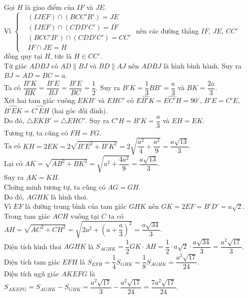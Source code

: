 \begin{ex}
{{
}
\noindent
Gọi $H$ là giao điểm của $IF$ và $JE$.\\
Vì $\left\{\begin{aligned}&(IJEF)\cap \left(BCC'B'\right)=JE \\&(IJEF)\cap \left(CDD'C'\right)=IF \\&\left(BCC'B'\right)\cap \left(CDD'C'\right)=CC' \\&IF\cap JE=H\end{aligned}\right.$ nên các đường thẳng $IF$, $JE$, $CC'$ đồng quy tại $H$, tức là $H\in CC'$.\\
Tứ giác $ADBJ$ có $AD\parallel BJ$ và $BD\parallel AJ$ nên $ADBJ$ là hình bình hành. Suy ra $BJ=AD=BC=a$.\\
Ta có $\dfrac{B'K}{BK}=\dfrac{B'E}{BJ} = \dfrac{B'E}{BC}=\dfrac{1}{2}$. Suy ra $B'K=\dfrac{1}{3}BB'=\dfrac{a}{3}$ và $BK=\dfrac{2a}{3}$.\\
Xét hai tam giác vuông $EKB'$ và $EHC'$ có $\widehat{EB'K}=\widehat{EC'H}=90^\circ$, $B'E=C'E$, $\widehat{B'EK}=\widehat{C'EH}$ (hai góc đối đỉnh).\\
Do đó, $\triangle EKB' = \triangle EHC'$. Suy ra $C'H=B'K=\dfrac{a}{3}$ và $EH=EK$.\\
Tương tự, ta cũng có $FH=FG$.\\
Ta có $KH=2EK=2\sqrt{B'E^2+B'K^2} = 2\sqrt{\dfrac{a^2}{4}+\dfrac{a^2}{9}} = \dfrac{a\sqrt{13}}{3}$.\\
Lại có $AK=\sqrt{AB^2+BK^2} = \sqrt{a^2+\dfrac{4a^2}{9}} = \dfrac{a\sqrt{13}}{3}$.\\
Suy ra $AK=KH$.\\
Chứng minh tương tự, ta cũng có $AG=GH$.\\
Do đó, $AGHK$ là hình thoi.\\
Vì $EF$ là đường trung bình của tam giác $GHK$ nên $GK=2EF=B'D'=a\sqrt{2}$.\\
Trong tam giác $ACH$ vuông tại $C$ ta có $AH=\sqrt{AC^2+CH^2} = \sqrt{2a^2+\left(a+\dfrac{a}{3}\right)^2} = \dfrac{a\sqrt{34}}{3}$.\\
Diện tích hình thoi $AGHK$ là $S_{AGHK}=\dfrac{1}{2}GK\cdot AH = \dfrac{1}{2}\cdot a\sqrt{2}\cdot \dfrac{a\sqrt{34}}{3} = \dfrac{a^2\sqrt{17}}{3}$.\\
Diện tích tam giác $EFH$ là $S_{EFH}=\dfrac{1}{4}S_{GHK}=\dfrac{1}{8}S_{AGHK} = \dfrac{a^2\sqrt{17}}{24}$.\\
Diện tích ngũ giác $AKEFG$ là $S_{AKEFG}=S_{AGHK}-S_{GHK} = \dfrac{a^2\sqrt{17}}{3}-\dfrac{a^2\sqrt{17}}{24} = \dfrac{7a^2\sqrt{17}}{24}$.
}
\end{ex}

